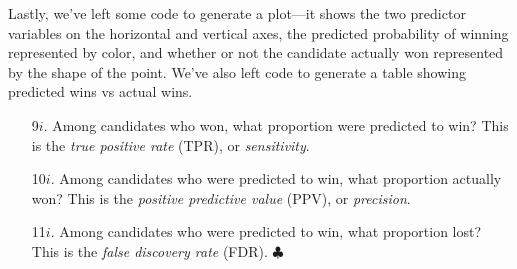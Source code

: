 \documentclass[10pt]{extarticle}
\begin{document}
Lastly, we've left some code to generate a plot---it shows the two predictor variables on the horizontal and vertical axes, the predicted probability of winning represented by color, and whether or not the candidate actually won represented by the shape of the point. We've also left code to generate a table showing predicted wins vs actual wins. 

\hfill 

\begin{itemize}
    
    \item[9$i$.] Among candidates who won, what proportion were predicted to win? This is the {\it true positive rate} (TPR), or {\it sensitivity}. \\ 
    
    \item[10$i$.] Among candidates who were predicted to win, what proportion actually won? This is the {\it positive predictive value} (PPV), or {\it precision}. \\ 
    
    \item[11$i$.] Among candidates who were predicted to win, what proportion lost? This is the {\it false discovery rate} (FDR). $\clubsuit$ \\ 


\end{itemize}
\end{document}
